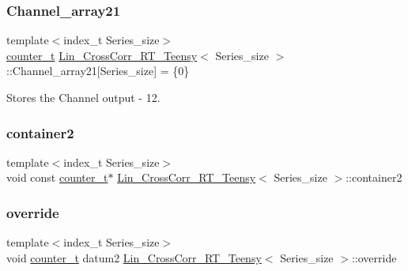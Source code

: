 \subsubsection{\texorpdfstring{Channel\+\_\+array21}{Channel\_array21}}
{\footnotesize\ttfamily template$<$index\+\_\+t Series\+\_\+size$>$ \\
\hyperlink{types_8hpp_a22f279793847eba127de149437848c48}{counter\+\_\+t} \hyperlink{classLin__CrossCorr__RT__Teensy}{Lin\+\_\+\+Cross\+Corr\+\_\+\+R\+T\+\_\+\+Teensy}$<$ Series\+\_\+size $>$\+::Channel\+\_\+array21\mbox{[}Series\+\_\+size\mbox{]} = \{0\}}



Stores the Channel output -\/ 12. 

\mbox{\label{classLin__CrossCorr__RT__Teensy_a9c49e09d3817e1f1344c51928e3afb57}} 
\subsubsection{\texorpdfstring{container2}{container2}}
{\footnotesize\ttfamily template$<$index\+\_\+t Series\+\_\+size$>$ \\
void const \hyperlink{types_8hpp_a22f279793847eba127de149437848c48}{counter\+\_\+t}$\ast$ \hyperlink{classLin__CrossCorr__RT__Teensy}{Lin\+\_\+\+Cross\+Corr\+\_\+\+R\+T\+\_\+\+Teensy}$<$ Series\+\_\+size $>$\+::container2}

\mbox{\label{classLin__CrossCorr__RT__Teensy_a5baab98aab70338799de9f82e7c7cc06}} 
\subsubsection{\texorpdfstring{override}{override}}
{\footnotesize\ttfamily template$<$index\+\_\+t Series\+\_\+size$>$ \\
void \hyperlink{types_8hpp_a22f279793847eba127de149437848c48}{counter\+\_\+t} datum2 \hyperlink{classLin__CrossCorr__RT__Teensy}{Lin\+\_\+\+Cross\+Corr\+\_\+\+R\+T\+\_\+\+Teensy}$<$ Series\+\_\+size $>$\+::override}


